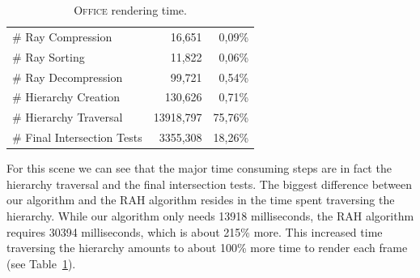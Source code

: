 \documentclass{egpubl}
\begin{document}
\begin{table}[!htb]
\begin{center}
\begin{tabular}{l|rr}
    \quad \# Ray Compression            & 16,651    & 0,09\%	\\
    \quad \# Ray Sorting                & 11,822	& 0,06\%    \\
    \quad \# Ray Decompression          & 99,721	& 0,54\%    \\
    \quad \# Hierarchy Creation         & 130,626	& 0,71\%    \\
    \quad \# Hierarchy Traversal        & 13918,797	& 75,76\%   \\
    \quad \# Final Intersection Tests   & 3355,308	& 18,26\%	\\
\end{tabular}
\end{center}
\caption{\label{table:office-time-results}
\textsc{Office} rendering time.}
\end{table}

For this scene we can see that the major time consuming steps are in fact the hierarchy traversal and the final intersection tests. The biggest difference between our algorithm and the RAH algorithm resides in the time spent traversing the hierarchy. While our algorithm only needs 13918 milliseconds, the RAH algorithm requires 30394 milliseconds, which is about 215\% more. This increased time traversing the hierarchy amounts to about 100\% more time to render each frame (see Table~\ref{table:office-time-results}).
\end{document}
